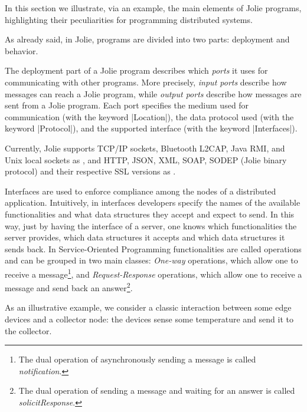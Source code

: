 In this section we illustrate, via an example, the main elements of
Jolie programs, highlighting their peculiarities for programming
distributed systems.


As already said, in Jolie, programs are divided into two
parts: deployment and behavior.

The deployment part of a Jolie program describes which \emph{ports} it
uses for communicating with other programs. More
precisely, \emph{input ports} describe how messages can reach a Jolie
program, while \emph{output ports} describe how messages are sent from
a Jolie program. Each port specifies the medium used for communication
(with the keyword
\code|Location|), the data protocol used (with the keyword
\code|Protocol|), and the supported interface (with the keyword
\code|Interfaces|). 

Currently, Jolie supports TCP/IP sockets, Bluetooth L2CAP, Java RMI,
and Unix local sockets as , and HTTP, JSON, XML,
SOAP, SODEP (Jolie binary protocol) and their respective SSL versions
as .

Interfaces are used to enforce compliance among the nodes of a
distributed application. Intuitively, in interfaces developers specify
the names of the available functionalities and what data structures
they accept and expect to send. In this way, just by having the
interface of a server, one knows which functionalities the server
provides, which data structures it accepts and which data structures
it sends back. In Service-Oriented Programming functionalities are
called operations and can be grouped in two main
classes: \emph{One-way} operations, which allow one to receive a
message\footnote{The dual operation of asynchronously sending a
message is called \emph{notification}.},
and \emph{Request-Response} operations, which allow one to receive a
message and send back an answer\footnote{The dual operation of sending a
message and waiting for an answer is called
\emph{solicitResponse}.}.

As an illustrative example, we consider a classic interaction between
some edge devices and a collector node: the devices sense some
temperature and send it to the collector.

